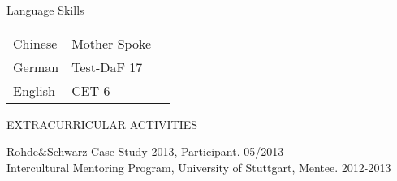\documentclass{resume} %
\begin{document}
\begin{rSection}{Language Skills}
\begin{tabular}{l l l}
Chinese & Mother Spoke  \\
German  & Test-DaF 17 \\
English & CET-6
\end{tabular}
\end{rSection}




\begin{rSection}{EXTRACURRICULAR  ACTIVITIES}

Rohde\&Schwarz Case Study 2013, Participant. \hfill 05/2013 \\
Intercultural Mentoring Program, University of Stuttgart, Mentee. \hfill 2012-2013 \\
\end{rSection}

% 
% 
\end{document}
